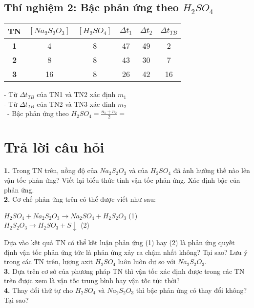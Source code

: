 \subsection{Thí nghiệm 2: Bậc phản ứng theo $H_{2}SO_{4}$}
\begin{center}
    \begin{tabular}{|c|c|c|c|c|c|}
         \hline \textbf{TN}&$[Na_{2}S_{2}O_{3}]$&$[H_{2}SO_{4}]$&$\Delta t_{1}$&$\Delta t_{2}$&$\Delta t_{TB}$\\
         \hline \textbf{1}&4&8&47&49&2\\
         \hline \textbf{2}&8&8&43&30&7\\
         \hline \textbf{3}&16&8&26&42&16\\
         \hline
    \end{tabular}
\end{center}

- Từ $\Delta t_{TB}$ của TN1 và TN2 xác định $m_{1}$\\
- Từ $\Delta t_{TB}$ của TN2 và TN3 xác đinh $m_{2}$\\\
- Bậc phản ứng theo $H_{2}SO_{4} = \frac{n_{1}+n_{2}}{2} = $\\

\newpage 

\section{Trả lời câu hỏi}

\textbf{1.} Trong TN trên, nồng độ của $Na_{2}S_{2}O_{3}$ và của $H_{2}SO_{4}$ đã ảnh hưởng thế nào lên vận tốc phản ứng? Viết lại biểu thức tính vận tốc phản ứng. Xác định bậc của phản ứng.\\

\textbf{2.} Cơ chế phản ứng trên có thể được viết như sau:
\begin{center}
    $H_{2}SO_{4} + Na_{2}S_{2}O_{3} \to Na_{2}SO_{4} + H_{2}S_{2}O_{3}$ (1)\\
    $H_{2}S_{2}O_{3} \to H_{2}SO_{3} + S \downarrow$ \hspace{2.9cm}(2)\\
\end{center}
Dựa vào kết quả TN có thể kết luận phản ứng (1) hay (2) là phản ứng quyết định vận tốc phản ứng tức là phản ứng xảy ra chậm nhất không? Tại sao? Lưu ý trong các TN trên, lượng axit $H_{2}SO_{4}$ luôn luôn dư so với $Na_{2}S_{2}O_{3}$.\\

\textbf{3.} Dựa trên cơ sở của phương pháp TN thì vận tốc xác định được trong các TN trên được xem là vận tốc trung bình hay vận tốc tức thời?\\

\textbf{4.} Thay đổi thứ tự cho $H_{2}SO_{4}$ và $Na_{2}S_{2}O_{3}$ thì bậc phản ứng có thay đổi không? Tại sao?\\
